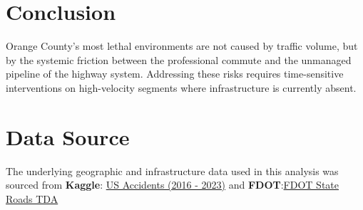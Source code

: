 \documentclass[12pt]{article}
\begin{document}
	\section*{Conclusion}
	Orange County’s most lethal environments are not caused by traffic volume, but by the systemic friction between the professional commute and the unmanaged pipeline of the highway system. Addressing these risks requires time-sensitive interventions on high-velocity segments where infrastructure is currently absent.
	
	\section*{Data Source}
	The underlying geographic and infrastructure data used in this analysis was sourced from \textbf{Kaggle}: 
	\href{https://www.kaggle.com/datasets/sobhanmoosavi/us-accidents}{US Accidents (2016 - 2023)} and \textbf{FDOT}:\href{https://gis-fdot.opendata.arcgis.com/datasets/d8ce6b8eee2646e6a0b534281e0391a0_0/explore?location=28.510591%2C-81.291546%2C10}{FDOT State Roads TDA}
	
\end{document}
